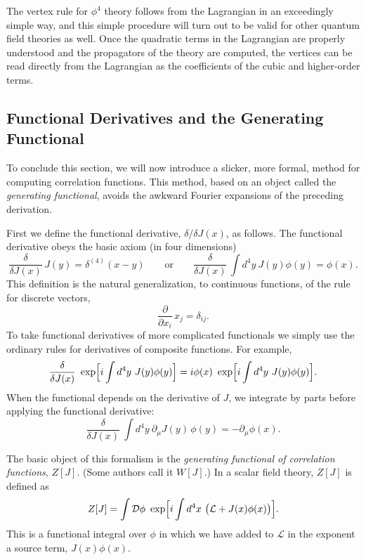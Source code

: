 The vertex rule for $\phi^4$ theory follows from the Lagrangian in an
exceedingly simple way, and this simple procedure will turn out to be valid
for other quantum field theories as well.  Once the quadratic terms in the
Lagrangian are properly understood and the propagators of the theory are
computed, the vertices can be read directly from the Lagrangian as the
coefficients of the cubic and higher-order terms.

\subsection{Functional Derivatives and the Generating Functional}

To conclude this section, we will now introduce a slicker, more formal, method
for computing correlation functions.  This method, based on an object called
the \emph{generating functional}, avoids the awkward Fourier expansions of the
preceding derivation.

First we define the functional derivative, $\delta/\delta J(x)$, as follows.
The functional derivative obeys the basic axiom (in four dimensions)
\begin{equation}
  \frac{\delta}{\delta J(x)}\,J(y) = \delta^{(4)}(x-y)
  \qquad\text{or}\qquad
  \frac{\delta}{\delta J(x)}\,\int d^4y\ J(y)\phi(y) = \phi(x) .
  \label{eq:9.31}
\end{equation}
This definition is the natural generalization, to continuous functions, of the
rule for discrete vectors,
\begin{equation}
  \frac{\partial}{\partial x_i}\,x_j = \delta_{ij} .
\end{equation}
To take functional derivatives of more complicated functionals we simply use
the ordinary rules for derivatives of composite functions.  For example,
\begin{equation}
  \frac{\delta}{\delta J(x)}\ \exp\Bigl[ i\int d^4y\ J(y)\phi(y) \Bigr]
  = i\phi(x)\ \exp\Bigl[ i\int d^4y\ J(y)\phi(y) \Bigr] .
  \label{eq:9.32}
\end{equation}
When the functional depends on the derivative of $J$, we integrate by parts
before applying the functional derivative:
\begin{equation}
  \frac{\delta}{\delta J(x)}\ \int d^4y\ \partial_\mu J(y)\,\phi(y)
  = -\partial_\mu\phi(x) .
  \label{eq:9.33}
\end{equation}

The basic object of this formalism is the \emph{generating functional of
correlation functions}, $Z[J]$.  (Some authors call it $W[J]$.)  In a scalar
field theory, $Z[J]$ is defined as
\begin{equation}
  Z[J] = \int \mathcal{D}\phi\ \exp\Bigl[ i\int d^4x\ \bigl(
    \mathcal{L} + J(x)\phi(x) \bigr) \Bigr] .
  \label{eq:9.34}
\end{equation}
This is a functional integral over $\phi$ in which we have added to
$\mathcal{L}$ in the exponent a source term, $J(x)\phi(x)$.

